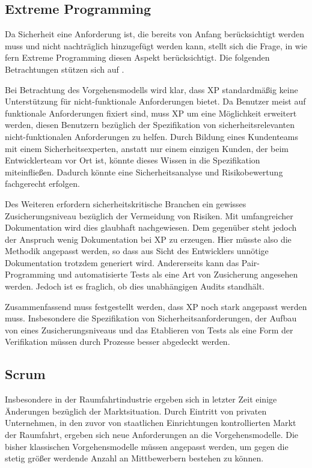 \subsection{Extreme Programming}

Da Sicherheit eine Anforderung ist, die bereits von Anfang berücksichtigt werden muss und nicht nachträglich hinzugefügt werden kann, stellt sich die Frage, in wie fern Extreme Programming diesen Aspekt berücksichtigt.
Die folgenden Betrachtungen stützen sich auf \parencite[][S. 8 ff.]{Wayrynen:2004aa}.

Bei Betrachtung des Vorgehensmodells wird klar, dass XP standardmäßig keine Unterstützung für nicht-funktionale Anforderungen bietet.
Da Benutzer meist auf funktionale Anforderungen fixiert sind, muss XP um eine Möglichkeit erweitert werden, diesen Benutzern bezüglich der Spezifikation von sicherheitsrelevanten nicht-funktionalen Anforderungen zu helfen.
Durch Bildung eines Kundenteams mit einem Sicherheitsexperten, anstatt nur einem einzigen Kunden, der beim Entwicklerteam vor Ort ist, könnte dieses Wissen in die Spezifikation miteinfließen.
Dadurch könnte eine Sicherheitsanalyse und Risikobewertung fachgerecht erfolgen.

Des Weiteren erfordern sicherheitskritische Branchen ein gewisses Zusicherungsniveau bezüglich der Vermeidung von Risiken.
Mit umfangreicher Dokumentation wird dies glaubhaft nachgewiesen.
Dem gegenüber steht jedoch der Anspruch wenig Dokumentation bei XP zu erzeugen.
Hier müsste also die Methodik angepasst werden, so dass aus Sicht des Entwicklers unnötige Dokumentation trotzdem generiert wird.
Andererseits kann das Pair-Programming und automatisierte Tests als eine Art von Zusicherung angesehen werden.
Jedoch ist es fraglich, ob dies unabhängigen Audits standhält.

Zusammenfassend muss festgestellt werden, dass XP noch stark angepasst werden muss.
Insbesondere die Spezifikation von Sicherheitsanforderungen, der Aufbau von eines Zusicherungsniveaus und das Etablieren von Tests als eine Form der Verifikation müssen durch Prozesse besser abgedeckt werden.

\subsection{Scrum} 

Insbesondere in der Raumfahrtindustrie ergeben sich in letzter Zeit einige Änderungen bezüglich der Marktsituation.
Durch Eintritt von privaten Unternehmen, in den zuvor von staatlichen Einrichtungen kontrollierten Markt der Raumfahrt, ergeben sich neue Anforderungen an die Vorgehensmodelle.
Die bisher klassischen Vorgehensmodelle müssen angepasst werden, um gegen die stetig größer werdende Anzahl an Mittbewerbern bestehen zu können.

